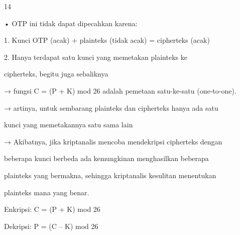 \documentclass{article}
\begin{document}

14

• OTP ini tidak dapat dipecahkan  karena:

   1. Kunci OTP (acak) + plainteks (tidak  acak) = cipherteks (acak)


2. Hanya terdapat satu kunci yang memetakan plainteks ke

        cipherteks, begitu juga sebaliknya 

       → fungsi C = (P + K) mod 26 adalah pemetaan satu-ke-satu (one-to-one).

       → artinya, untuk sembarang plainteks dan cipherteks hanya ada satu 

kunci yang memetakannya satu sama lain

       → Akibatnya, jika kriptanalis mencoba mendekripsi cipherteks dengan 

beberapa  kunci berbeda ada kemungkinan menghasilkan beberapa 

plainteks yang bermakna, sehingga kriptanalis kesulitan menentukan 

plainteks mana yang benar.

Enkripsi: C = (P + K) mod 26

Dekripsi: P = (C – K) mod 26
\end{document}
